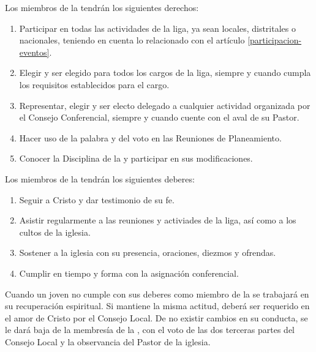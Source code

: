 

\article
Los miembros de la \LMJ{} tendrán los siguientes derechos:
\label{derechos-miembros}
\begin{enumerate}
    \item Participar en todas las actividades de la liga, ya sean locales, distritales o nacionales, teniendo en cuenta lo relacionado con el artículo \ref{participacion-eventos}.
    \item Elegir y ser elegido para todos los cargos de la liga, siempre y cuando cumpla los requisitos establecidos para el cargo.
    \item Representar, elegir y ser electo delegado a cualquier actividad organizada por el Consejo Conferencial, siempre y cuando cuente con el aval de su Pastor.
    \item Hacer uso de la palabra y del voto en las Reuniones de Planeamiento.
    \item Conocer la Disciplina de la \LMJ{} y participar en sus modificaciones.
\end{enumerate}

\article
\label{deberes-miembros}
Los miembros de la \LMJ{} tendrán los siguientes deberes:
\begin{enumerate}
    \item Seguir a Cristo y dar testimonio de su fe.
    \item Asistir regularmente a las reuniones y activiades de la liga, así como a los cultos de la iglesia.
    \item Sostener a la iglesia con su presencia, oraciones, diezmos y ofrendas.
    \item Cumplir en tiempo y forma con la asignación conferencial.
\end{enumerate}

\article
Cuando un joven no cumple con sus deberes como miembro de la \LMJ{} se trabajará en su recuperación espiritual. Si mantiene la misma actitud, deberá ser requerido en el amor de Cristo por el Consejo Local. De no existir cambios en su conducta, se le dará baja de la membresía de la \LMJ{}, con el voto de las dos terceras partes del Consejo Local y la observancia del Pastor de la iglesia.
